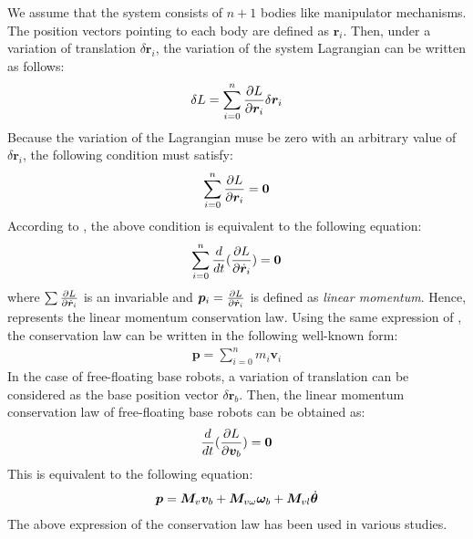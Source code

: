 We assume that the system consists of $n+1$ bodies like manipulator mechanisms.
The position vectors pointing to each body are defined as $\bm{r}_{i}$.
Then, under a variation of translation $\delta \bm{r}_{i}$,
the variation of the system Lagrangian can be written as follows:
%
\begin{align}
  \delta L = \sum_{i = 0}^{n}{\frac{\partial L}{\partial \bm{r}_{i}}}\delta \bm{r}_{i}
\end{align}
%
Because the variation of the Lagrangian muse be zero with an arbitrary value of $\delta \bm{r}_{i}$,
the following condition must satisfy:
%
\begin{align}
  \sum_{i=0}^{n}{\frac{\partial L}{\partial \bm{r}_{i}}} = \bm{0}
\end{align}
%
According to ,
the above condition is equivalent to the following equation:
%
\begin{align}
  \sum_{i=0}^{n}\frac{d}{dt}({\frac{\partial L}{\partial \dot{\bm{r}}_{i}}}) = \bm{0}\label{eq:LINEAR_GEN}
\end{align}
%
where $\sum{\frac{\partial L}{\partial \dot{\bm{r}}_{i}}}$ is an invariable and 
$\bm{p}_{i} = {\frac{\partial L}{\partial \dot{\bm{r}}_{i}}}$ is defined as \textit{linear momentum}.
Hence,  represents the linear momentum conservation law.
Using the same expression of ,
the conservation law can be written in the following well-known form:
%
\begin{align}
  \bm{p} = \sum_{i=0}^{n}m_{i}\bm{v}_{i}
\end{align}
%
In the case of free-floating base robots,
a variation of translation can be considered as the base position vector $\delta \bm{r}_{b}$.
Then, the linear momentum conservation law of free-floating base robots can be obtained as:
%
\begin{align}
  \frac{d}{dt}({\frac{\partial L}{\partial \bm{v}_{b}}}) = \bm{0}\label{eq:LINE_MOM_LAW}
\end{align}
%
This is equivalent to the following equation:
%
\begin{align}
  \bm{p} = \bm{M}_{v}\bm{v}_{b} + \bm{M}_{v\omega}\bm{\omega}_{b} + \bm{M}_{vl}{\dot{\bm{\theta}}}
\end{align}
%
The above expression of the conservation law has been used in various studies.

